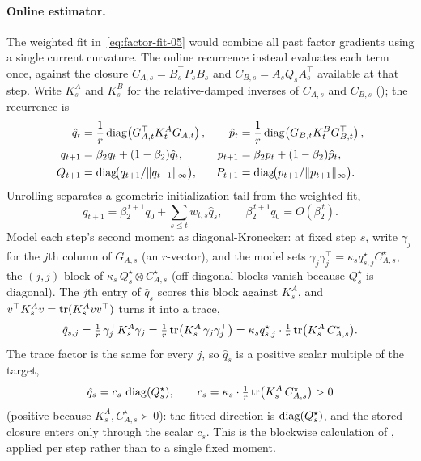 \paragraph{Online estimator.}
The weighted fit in~\eqref{eq:factor-fit-05} would combine all past
factor gradients using a single current curvature. The online recurrence
instead evaluates each term once, against the closure
$C_{A,s}=B_s^\top P_sB_s$ and $C_{B,s}=A_sQ_sA_s^\top$ available at that
step. Write $K^A_s$ and $K^B_s$ for the relative-damped inverses of
$C_{A,s}$ and $C_{B,s}$ (); the recurrence is
\begin{equation}\label{eq:ours-klcoupling-05}
\begin{aligned}
  \hat{q}_t
    &= \frac1r\operatorname{diag}\!\left(G_{A,t}^\top K^A_tG_{A,t}\right),
  &
  \hat{p}_t
    &= \frac1r\operatorname{diag}\!\left(G_{B,t} K^B_tG_{B,t}^\top\right),
  \\
  q_{t+1}
    &= \beta_2q_t+(1-\beta_2)\hat{q}_t,
  &
  p_{t+1}
    &= \beta_2p_t+(1-\beta_2)\hat{p}_t,
  \\
  Q_{t+1}
    &= \operatorname{diag}\!\bigl(q_{t+1}/\| q_{t+1}\|_\infty\bigr),
  &
  P_{t+1}
    &= \operatorname{diag}\!\bigl(p_{t+1}/\| p_{t+1}\|_\infty\bigr).
\end{aligned}
\end{equation}
Unrolling separates a geometric initialization tail from the weighted fit,
\[
  q_{t+1}=\beta_2^{\,t+1}q_0+\sum_{s\le t}w_{t,s}\hat q_s ,
  \qquad
  \beta_2^{\,t+1}q_0=O(\beta_2^{\,t}) .
\]
Model each step's second moment as diagonal-Kronecker: at fixed step $s$, write
$\gamma_j$ for the $j$th column of $G_{A,s}$ (an $r$-vector), and the model sets
$\gamma_j\gamma_j^\top=\kappa_s q^\star_{s,j}C^\star_{A,s}$, the $(j,j)$ block of
$\kappa_s\,Q^\star_s\otimes C^\star_{A,s}$ (off-diagonal blocks vanish because
$Q^\star_s$ is diagonal). The $j$th entry of $\hat q_s$ scores this block
against $K^A_s$, and $v^\top K^A_sv=\operatorname{tr}(K^A_svv^\top)$ turns it into a trace,
\[
  \hat q_{s,j}
  =\tfrac1r\,\gamma_j^\top K^A_s\gamma_j
  =\tfrac1r\operatorname{tr}\!\big(K^A_s\,\gamma_j\gamma_j^\top\big)
  =\kappa_s q^\star_{s,j}\cdot\tfrac1r\operatorname{tr}\!\big(K^A_s\,C^\star_{A,s}\big).
\]
The trace factor is the same for every $j$, so $\hat q_s$ is a positive scalar
multiple of the target,
\[
  \hat q_s=c_s\,\operatorname{diag}(Q^\star_s),
  \qquad
  c_s=\kappa_s\cdot\tfrac1r\operatorname{tr}\!\big(K^A_s\,C^\star_{A,s}\big)>0
\]
(positive because $K^A_s,C^\star_{A,s}\succ0$): the fitted direction is
$\operatorname{diag}(Q^\star_s)$, and the stored closure enters only through the scalar $c_s$.
This is the blockwise calculation of , applied per step
rather than to a single fixed moment.


